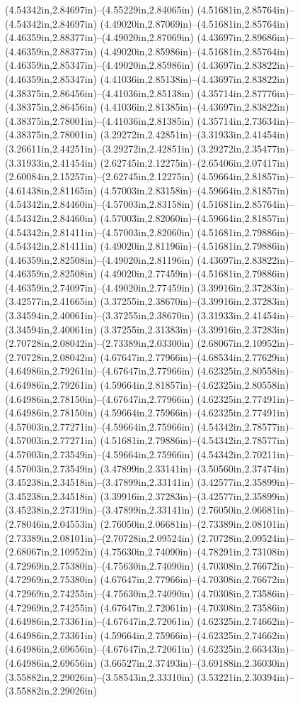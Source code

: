 (4.54342in,2.84697in)--(4.55229in,2.84065in) (4.51681in,2.85764in)--(4.54342in,2.84697in) (4.49020in,2.87069in)--(4.51681in,2.85764in) (4.46359in,2.88377in)--(4.49020in,2.87069in) (4.43697in,2.89686in)--(4.46359in,2.88377in) (4.49020in,2.85986in)--(4.51681in,2.85764in) (4.46359in,2.85347in)--(4.49020in,2.85986in) (4.43697in,2.83822in)--(4.46359in,2.85347in) (4.41036in,2.85138in)--(4.43697in,2.83822in) (4.38375in,2.86456in)--(4.41036in,2.85138in) (4.35714in,2.87776in)--(4.38375in,2.86456in) (4.41036in,2.81385in)--(4.43697in,2.83822in) (4.38375in,2.78001in)--(4.41036in,2.81385in) (4.35714in,2.73634in)--(4.38375in,2.78001in) (3.29272in,2.42851in)--(3.31933in,2.41454in) (3.26611in,2.44251in)--(3.29272in,2.42851in) (3.29272in,2.35477in)--(3.31933in,2.41454in) (2.62745in,2.12275in)--(2.65406in,2.07417in) (2.60084in,2.15257in)--(2.62745in,2.12275in) (4.59664in,2.81857in)--(4.61438in,2.81165in) (4.57003in,2.83158in)--(4.59664in,2.81857in) (4.54342in,2.84460in)--(4.57003in,2.83158in) (4.51681in,2.85764in)--(4.54342in,2.84460in) (4.57003in,2.82060in)--(4.59664in,2.81857in) (4.54342in,2.81411in)--(4.57003in,2.82060in) (4.51681in,2.79886in)--(4.54342in,2.81411in) (4.49020in,2.81196in)--(4.51681in,2.79886in) (4.46359in,2.82508in)--(4.49020in,2.81196in) (4.43697in,2.83822in)--(4.46359in,2.82508in) (4.49020in,2.77459in)--(4.51681in,2.79886in) (4.46359in,2.74097in)--(4.49020in,2.77459in) (3.39916in,2.37283in)--(3.42577in,2.41665in) (3.37255in,2.38670in)--(3.39916in,2.37283in) (3.34594in,2.40061in)--(3.37255in,2.38670in) (3.31933in,2.41454in)--(3.34594in,2.40061in) (3.37255in,2.31383in)--(3.39916in,2.37283in) (2.70728in,2.08042in)--(2.73389in,2.03300in) (2.68067in,2.10952in)--(2.70728in,2.08042in) (4.67647in,2.77966in)--(4.68534in,2.77629in) (4.64986in,2.79261in)--(4.67647in,2.77966in) (4.62325in,2.80558in)--(4.64986in,2.79261in) (4.59664in,2.81857in)--(4.62325in,2.80558in) (4.64986in,2.78150in)--(4.67647in,2.77966in) (4.62325in,2.77491in)--(4.64986in,2.78150in) (4.59664in,2.75966in)--(4.62325in,2.77491in) (4.57003in,2.77271in)--(4.59664in,2.75966in) (4.54342in,2.78577in)--(4.57003in,2.77271in) (4.51681in,2.79886in)--(4.54342in,2.78577in) (4.57003in,2.73549in)--(4.59664in,2.75966in) (4.54342in,2.70211in)--(4.57003in,2.73549in) (3.47899in,2.33141in)--(3.50560in,2.37474in) (3.45238in,2.34518in)--(3.47899in,2.33141in) (3.42577in,2.35899in)--(3.45238in,2.34518in) (3.39916in,2.37283in)--(3.42577in,2.35899in) (3.45238in,2.27319in)--(3.47899in,2.33141in) (2.76050in,2.06681in)--(2.78046in,2.04553in) (2.76050in,2.06681in)--(2.73389in,2.08101in) (2.73389in,2.08101in)--(2.70728in,2.09524in) (2.70728in,2.09524in)--(2.68067in,2.10952in) (4.75630in,2.74090in)--(4.78291in,2.73108in) (4.72969in,2.75380in)--(4.75630in,2.74090in) (4.70308in,2.76672in)--(4.72969in,2.75380in) (4.67647in,2.77966in)--(4.70308in,2.76672in) (4.72969in,2.74255in)--(4.75630in,2.74090in) (4.70308in,2.73586in)--(4.72969in,2.74255in) (4.67647in,2.72061in)--(4.70308in,2.73586in) (4.64986in,2.73361in)--(4.67647in,2.72061in) (4.62325in,2.74662in)--(4.64986in,2.73361in) (4.59664in,2.75966in)--(4.62325in,2.74662in) (4.64986in,2.69656in)--(4.67647in,2.72061in) (4.62325in,2.66343in)--(4.64986in,2.69656in) (3.66527in,2.37493in)--(3.69188in,2.36030in) (3.55882in,2.29026in)--(3.58543in,2.33310in) (3.53221in,2.30394in)--(3.55882in,2.29026in) 